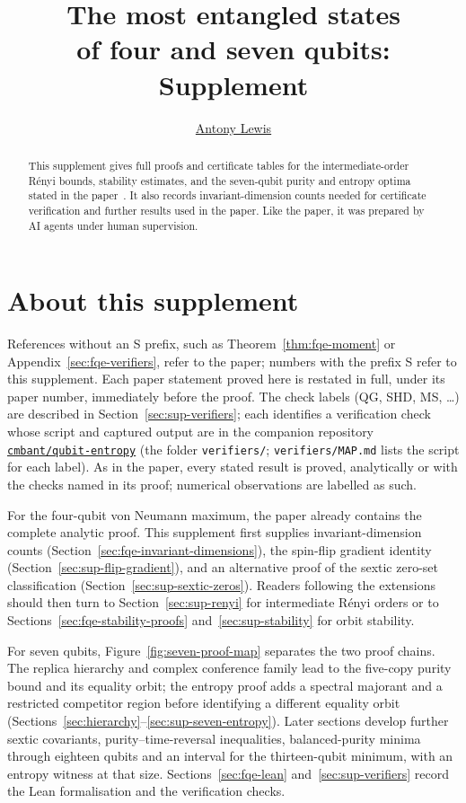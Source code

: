 \documentclass[11pt]{article}
\title{The most entangled states\\of four and seven qubits:\\[0.4em]{\large Supplement}}
\author{\href{https://orcid.org/0000-0001-5927-6667}{Antony Lewis} \affiliation{\Sussex}}
\date{}
\numberwithin{equation}{section}
\begin{document}
\maketitle
\begin{abstract}
This supplement gives full proofs and certificate tables for the intermediate-order R\'enyi bounds,
stability estimates, and the seven-qubit purity and entropy optima stated in the paper~\cite{Paper}.
It also records invariant-dimension counts needed for certificate verification and further results
used in the paper. Like the paper, it was prepared by AI agents under human supervision.
\end{abstract}

{\small\setcounter{tocdepth}{1}\makeatletter\renewcommand*\l@section{\@dottedtocline{1}{0em}{2.6em}}\makeatother\tableofcontents}

\section{About this supplement}\label{sec:sup-about}
References without an S prefix, such as Theorem~\ref{thm:fqe-moment} or Appendix~\ref{sec:fqe-verifiers}, refer to the paper; numbers with
the prefix S refer to this supplement. Each paper statement proved here is restated in full, under its paper number,
immediately before the proof. The check labels (QG, SHD, MS, \dots) are described in Section~\ref{sec:sup-verifiers}; each identifies a verification check whose script and captured output are in the companion repository
\href{https://github.com/cmbant/qubit-entropy}{\texttt{cmbant/qubit-entropy}}
(the folder \texttt{verifiers/}; \texttt{verifiers/MAP.md} lists the script for each label). As in the paper, every stated result is proved, analytically or with the checks named in its proof; numerical observations are labelled as such.

For the four-qubit von Neumann maximum, the paper already contains the complete analytic
proof. This supplement first supplies invariant-dimension counts
(Section~\ref{sec:fqe-invariant-dimensions}), the spin-flip gradient identity
(Section~\ref{sec:sup-flip-gradient}), and an alternative proof of the sextic zero-set classification
(Section~\ref{sec:sup-sextic-zeros}). Readers following the extensions should then turn to
Section~\ref{sec:sup-renyi} for intermediate R\'enyi orders or to
Sections~\ref{sec:fqe-stability-proofs} and~\ref{sec:sup-stability} for orbit stability.

For seven qubits, Figure~\ref{fig:seven-proof-map} separates the two proof chains.
The replica hierarchy and complex conference family lead to the five-copy purity bound and
its equality orbit; the entropy proof adds a spectral majorant and a restricted
competitor region before identifying a different equality orbit
(Sections~\ref{sec:hierarchy}--\ref{sec:sup-seven-entropy}).
Later sections develop further sextic covariants, purity--time-reversal
inequalities, balanced-purity minima through eighteen qubits and an interval for the thirteen-qubit minimum, with an entropy witness at that size. Sections~\ref{sec:fqe-lean} and~\ref{sec:sup-verifiers} record the Lean
formalisation and the verification checks.
\end{document}
